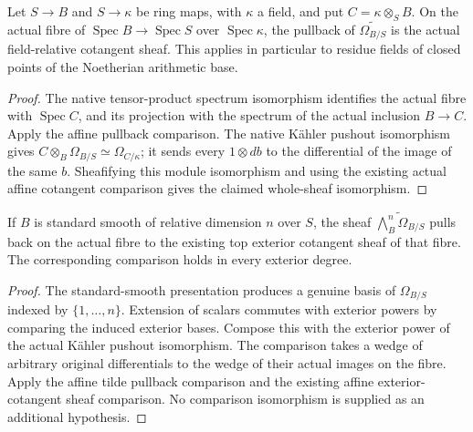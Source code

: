 \begin{theorem}
\label{thm:kn-arithmetic-affine-cotangent-fibre}
\leanok
{}
Let $S\to B$ and $S\to\kappa$ be ring maps, with $\kappa$ a field, and put
$C=\kappa\otimes_S B$.  On the actual fibre of
$\operatorname{Spec}B\to\operatorname{Spec}S$ over $\operatorname{Spec}\kappa$,
the pullback of $\widetilde{\Omega_{B/S}}$ is the actual field-relative
cotangent sheaf.  This applies in particular to residue fields of closed
points of the Noetherian arithmetic base.
\end{theorem}
\begin{proof}
The native tensor-product spectrum isomorphism identifies the actual fibre
with $\operatorname{Spec}C$, and its projection with the spectrum of the actual
inclusion $B\to C$.  Apply the affine pullback comparison.  The native K\"ahler
pushout isomorphism gives
$C\otimes_B\Omega_{B/S}\simeq\Omega_{C/\kappa}$; it sends every
$1\otimes db$ to the differential of the image of the same $b$.
Sheafifying this module isomorphism and using the existing actual affine
cotangent comparison gives the claimed whole-sheaf isomorphism.
\end{proof}

\begin{theorem}
\label{thm:kn-arithmetic-affine-canonical-fibre}
\leanok
{}
If $B$ is standard smooth of relative dimension $n$ over $S$, the sheaf
$\widetilde{\bigwedge^n_B\Omega_{B/S}}$ pulls back on the actual fibre to the
existing top exterior cotangent sheaf of that fibre.  The corresponding
comparison holds in every exterior degree.
\end{theorem}
\begin{proof}
The standard-smooth presentation produces a genuine basis of
$\Omega_{B/S}$ indexed by $\{1,\ldots,n\}$.  Extension of scalars commutes with
exterior powers by comparing the induced exterior bases.  Compose this with
the exterior power of the actual K\"ahler pushout isomorphism.  The comparison
takes a wedge of arbitrary original differentials to the wedge of their actual
images on the fibre.  Apply the affine tilde pullback comparison and the
existing affine exterior-cotangent sheaf comparison.  No comparison
isomorphism is supplied as an additional hypothesis.
\end{proof}

